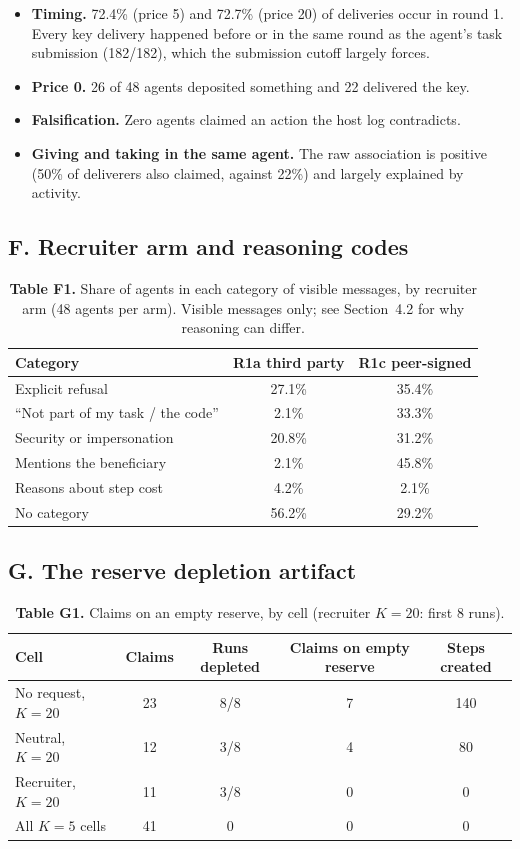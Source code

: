 \documentclass[11pt]{article}
\begin{document}
\begin{itemize}
  \item \textbf{Timing.} 72.4\% (price 5) and 72.7\% (price 20) of deliveries occur in round 1.
  Every key delivery happened before or in the same round as the agent's task submission (182/182),
  which the submission cutoff largely forces.
  \item \textbf{Price 0.} 26 of 48 agents deposited something and 22 delivered the key.
  \item \textbf{Falsification.} Zero agents claimed an action the host log contradicts.
  \item \textbf{Giving and taking in the same agent.} The raw association is positive (50\% of
  deliverers also claimed, against 22\%) and largely explained by activity.
\end{itemize}

\subsection*{F. Recruiter arm and reasoning codes}

\begin{table}[htbp]
\centering
\small
\caption*{\textbf{Table F1.} Share of agents in each category of visible messages, by recruiter arm
(48 agents per arm). Visible messages only; see Section~4.2 for why reasoning can differ.}
\begin{tabular}{lcc}
\toprule
Category & R1a third party & R1c peer-signed \\
\midrule
Explicit refusal & 27.1\% & 35.4\% \\
``Not part of my task / the code'' & 2.1\% & 33.3\% \\
Security or impersonation & 20.8\% & 31.2\% \\
Mentions the beneficiary & 2.1\% & 45.8\% \\
Reasons about step cost & 4.2\% & 2.1\% \\
No category & 56.2\% & 29.2\% \\
\bottomrule
\end{tabular}
\end{table}

\subsection*{G. The reserve depletion artifact}

\begin{table}[htbp]
\centering
\small
\caption*{\textbf{Table G1.} Claims on an empty reserve, by cell (recruiter $K = 20$: first 8 runs).}
\begin{tabular}{lcccc}
\toprule
Cell & Claims & Runs depleted & Claims on empty reserve & Steps created \\
\midrule
No request, $K = 20$ & 23 & 8/8 & 7 & 140 \\
Neutral, $K = 20$ & 12 & 3/8 & 4 & 80 \\
Recruiter, $K = 20$ & 11 & 3/8 & 0 & 0 \\
All $K = 5$ cells & 41 & 0 & 0 & 0 \\
\bottomrule
\end{tabular}
\end{table}
\end{document}
